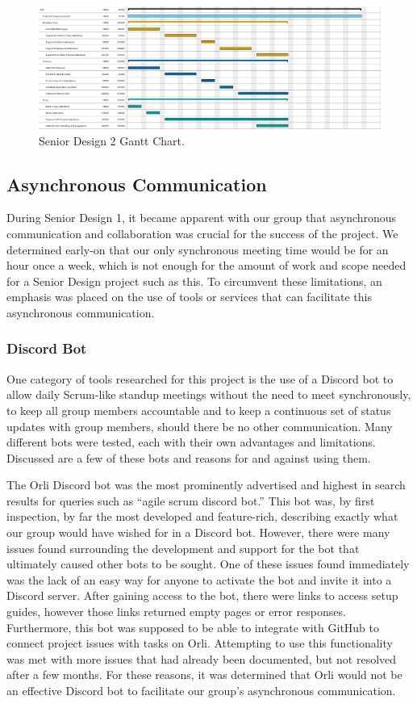 \documentclass[
    paper=letter,
    parskip=half,
    fontsize=12pt,
    titlepage=firstiscover,
    toc=bibliography,
    numbers=endperiod
]{scrartcl}
\begin{document}
\begin{figure}[H]
    \includegraphics[width=\textwidth]{gantt-sd2}
    \caption{Senior Design 2 Gantt Chart.}
\end{figure}


\subsection{Asynchronous Communication}

During Senior Design 1, it became apparent with our group that
asynchronous communication and collaboration was crucial for the success
of the project. We determined early-on that our only synchronous meeting
time would be for an hour once a week, which is not enough for the
amount of work and scope needed for a Senior Design project such as
this. To circumvent these limitations, an emphasis was placed on the use
of tools or services that can facilitate this asynchronous
communication.

\subsubsection{Discord Bot}

One category of tools researched for this project is the use of a
Discord bot to allow daily Scrum-like standup meetings without the need
to meet synchronously, to keep all group members accountable and to keep
a continuous set of status updates with group members, should there be
no other communication. Many different bots were tested, each with their
own advantages and limitations. Discussed are a few of these bots and
reasons for and against using them.

The Orli Discord bot \cite{orli} was the most prominently advertised and highest in
search results for queries such as ``agile scrum discord bot.'' This bot
was, by first inspection, by far the most developed and feature-rich,
describing exactly what our group would have wished for in a Discord
bot. However, there were many issues found surrounding the development
and support for the bot that ultimately caused other bots to be sought.
One of these issues found immediately was the lack of an easy way for
anyone to activate the bot and invite it into a Discord server. After
gaining access to the bot, there were links to access setup guides,
however those links returned empty pages or error responses.
Furthermore, this bot was supposed to be able to integrate with GitHub
to connect project issues with tasks on Orli. Attempting to use this
functionality was met with more issues that had already been documented,
but not resolved after a few months. For these reasons, it was
determined that Orli would not be an effective Discord bot to facilitate
our group's asynchronous communication.
\end{document}
